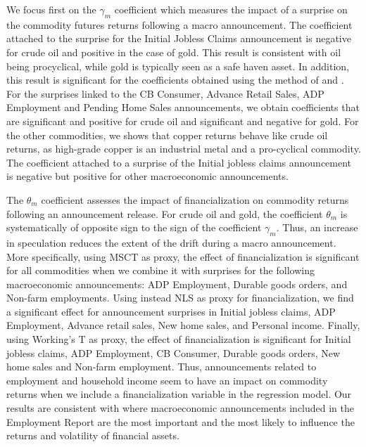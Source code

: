 \documentclass[12pt]{article}
\begin{document}
We focus first on the $\gamma_m$ coefficient which measures the impact of a surprise on the commodity futures returns following a macro announcement. The coefficient attached to the surprise for the Initial Jobless Claims announcement is negative for crude oil and positive in the case of gold. This result is consistent with oil being procyclical, while gold is typically seen as a safe haven asset.  In addition, this result is significant for the coefficients obtained using the method of \citet{kurov2019price} and \citet{andersen2007real}. For the surprises linked to the CB Consumer, Advance Retail Sales, ADP Employment and Pending Home Sales announcements, we obtain coefficients that are significant and positive for crude oil  and significant and negative for gold. For the other commodities, we shows that copper returns behave like crude oil returns, as high-grade copper is an industrial metal and a pro-cyclical commodity. The coefficient attached to a surprise of the Initial jobless claims announcement is negative but positive for other macroeconomic announcements. 


The $\theta_m$ coefficient assesses the impact of financialization on commodity returns following an announcement release. For crude oil and gold, the coefficient $\theta_m$ is systematically of opposite sign to the sign of the coefficient $\gamma_m$. Thus, an increase in speculation reduces the extent of the drift during a macro  announcement. More specifically, using MSCT as proxy, the effect of financialization is significant for all commodities when we combine it with surprises for the following macroeconomic announcements: ADP Employment, Durable goods orders, and Non-farm employments. Using instead NLS as proxy for financialization, we find a significant effect for announcement surprises in Initial jobless claims, ADP Employment, Advance retail sales, New home sales, and Personal income. Finally, using Working's T as proxy, the effect of financialization is significant for  Initial jobless claims, ADP Employment, CB Consumer, Durable goods orders, New home sales and Non-farm employment. Thus,  announcements related to employment and household income seem to have an impact on commodity returns when we include a financialization variable in the regression model. Our results are consistent with \citet{hordahl2015expectations} where macroeconomic announcements included in the Employment Report are the most important and the most likely to influence the returns and  volatility of financial assets.
  
\end{document}
